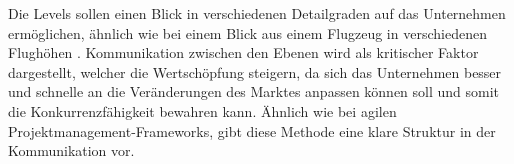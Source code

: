 Die Levels sollen einen Blick in verschiedenen Detailgraden auf das Unternehmen ermöglichen, ähnlich wie bei einem Blick aus einem Flugzeug in verschiedenen Flughöhen \cite{}. Kommunikation zwischen den Ebenen wird als kritischer Faktor dargestellt, welcher die Wertschöpfung steigern, da sich das Unternehmen besser und schnelle an die Veränderungen des Marktes anpassen können soll und somit die Konkurrenzfähigkeit bewahren kann. Ähnlich wie bei agilen Projektmanagement-Frameworks, gibt diese Methode eine klare Struktur in der Kommunikation vor.